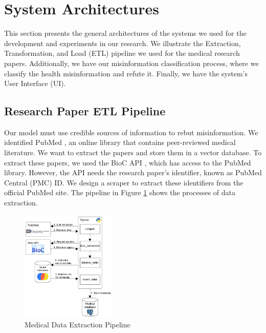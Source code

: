 
\section{System Architectures}

This section presents the general architectures of the systems we used for the development and experiments in our research. We illustrate the Extraction, Transformation, and Load (ETL) pipeline we used for the medical research papers. Additionally, we have our misinformation classification process, where we classify the health misinformation and refute it. Finally, we have the system's User Interface (UI).

\subsection{Research Paper ETL Pipeline}

Our model must use credible sources of information to rebut misinformation. We identified PubMed \cite{pubmed}, an online library that contains peer-reviewed medical literature. We want to extract the papers and store them in a vector database. To extract these papers, we used the BioC API \cite{bioinformatics}, which has access to the PubMed library. However, the API needs the research paper's identifier, known as PubMed Central (PMC) ID. We design a scraper to extract these identifiers from the official PubMed site. The pipeline in Figure \ref{fig:etl} shows the processes of data extraction. 

\begin{figure}[h]
	\begin{center}
		\includegraphics[width=0.4\textwidth]{figures/ETL_Pipeline.png} %
	\end{center}
	\caption{Medical Data Extraction Pipeline} %
	\label{fig:etl}
\end{figure}

